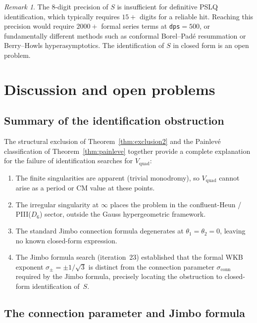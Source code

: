 \documentclass[11pt,a4paper]{article}
\theoremstyle{definition}
\theoremstyle{remark}
\newtheorem{remark}[theorem]{Remark}
\newcommand{\Vq}{V_{\mathrm{quad}}}
\begin{document}
\begin{remark}
The $8$-digit precision of $S$ is insufficient
for definitive PSLQ identification, which
typically requires $15+$ digits for a
reliable hit. Reaching this precision would
require $2000+$ formal series terms at
\texttt{dps}$=500$, or fundamentally
different methods such as conformal
Borel--Pad\'e resummation or Berry--Howls
hyperasymptotics. The identification of $S$
in closed form is an open problem.
\end{remark}


\section{Discussion and open problems}
\label{sec:discussion}

\subsection{Summary of the identification
obstruction}

The structural exclusion of
Theorem~\ref{thm:exclusion2} and the
Painlev\'e classification of
Theorem~\ref{thm:painleve} together
provide a complete explanation for the
failure of identification searches
for $\Vq$:
\begin{enumerate}
\item The finite singularities are apparent
  (trivial monodromy), so $\Vq$ cannot arise
  as a period or CM value at these points.
\item The irregular singularity at $\infty$
  places the problem in the confluent-Heun /
  PIII($D_6$) sector, outside the Gauss
  hypergeometric framework.
\item The standard Jimbo connection formula
  degenerates at $\theta_1 = \theta_2 = 0$,
  leaving no known closed-form expression.
\item The Jimbo formula search (iteration~23)
  established that the formal WKB exponent
  $\sigma_\pm = \pm 1/\sqrt{3}$ is distinct
  from the connection parameter
  $\sigma_{\mathrm{conn}}$ required by the
  Jimbo formula, precisely locating the
  obstruction to closed-form identification
  of~$S$.
\end{enumerate}

\subsection{The connection parameter and
Jimbo formula}
\end{document}
